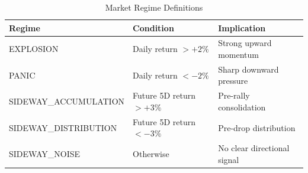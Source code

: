 \begin{table}[H]
    \centering
    \caption{Market Regime Definitions}
    \label{tab:regimes}
    \begin{tabular}{lll}
        \toprule
        \textbf{Regime} & \textbf{Condition} & \textbf{Implication} \\
        \midrule
        EXPLOSION & Daily return $> +2\%$ & Strong upward momentum \\
        PANIC & Daily return $< -2\%$ & Sharp downward pressure \\
        SIDEWAY\_ACCUMULATION & Future 5D return $> +3\%$ & Pre-rally consolidation \\
        SIDEWAY\_DISTRIBUTION & Future 5D return $< -3\%$ & Pre-drop distribution \\
        SIDEWAY\_NOISE & Otherwise & No clear directional signal \\
        \bottomrule
    \end{tabular}
\end{table}
